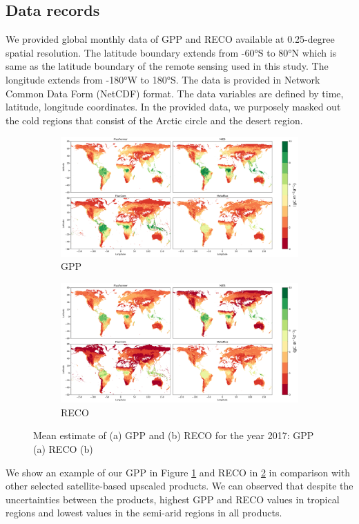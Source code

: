 \subsection{Data records}
We provided global monthly data of GPP and RECO available at 0.25-degree spatial resolution. The latitude boundary extends from -60°S to 80°N which is same as the latitude boundary of the remote sensing used in this study. The longitude extends from -180°W to 180°S. The data is provided in Network Common Data Form (NetCDF) format. The data variables are defined by time, latitude, longitude coordinates. In the provided data, we purposely masked out the cold regions that consist of the Arctic circle and the desert region. \par
\begin{figure}[tbh!]
    \centering
    \begin{subfigure}{\textwidth}
      \centering
      \includegraphics[width=\textwidth]{figs/chap6/GPP_2017_mean.png}
      \caption{GPP}
      \label{fig:chap6_fig2a}
    \end{subfigure}

    \begin{subfigure}{\textwidth}
      \centering
      \includegraphics[width=\textwidth]{figs/chap6/RECO_2017_mean.png}
      \caption{RECO}
      \label{fig:chap6_fig2b}
    \end{subfigure}
    \caption[Mean estimate of GPP and RECO in 2017]{Mean estimate of (a) GPP and (b) RECO for the year 2017: GPP (a) RECO (b)}
    \label{fig:chap6_fig2}
\end{figure}
We show an example of our GPP in Figure \ref{fig:chap6_fig2a} and RECO in \ref{fig:chap6_fig2b} in comparison with other selected satellite-based upscaled products. We can observed that despite the uncertainties between the products, highest GPP and RECO values in tropical regions and lowest values in the semi-arid regions in all products. \par

